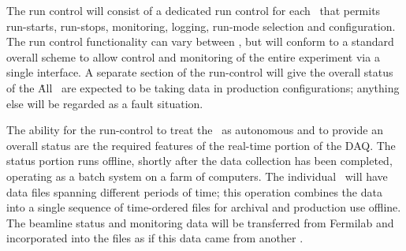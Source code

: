 The  run control will consist of a dedicated run control for each
\COMPARTMENT\ that permits run-starts, run-stops, monitoring, logging,
run-mode selection and configuration.  The run control functionality can
vary between \COMPARTMENTS, but will conform to a
standard overall scheme to allow %
control and monitoring of the entire experiment via a single interface.
A separate section of the
run-control will give the overall status of the \COMPARTMENTS\. All
\COMPARTMENTS\ are expected to be taking data in production configurations; anything else will be regarded as a fault situation. 

The ability for the run-control to treat the \COMPARTMENTS\ as
autonomous and to provide an overall status are the required features of the
real-time portion of the DAQ.
The status portion %
runs offline, shortly after the data collection has been
completed, operating as a batch system on a farm of
computers.  The individual \COMPARTMENTS\
will have data files spanning different periods of time; this operation combines
the data into
a single sequence of time-ordered files for archival and production
use offline.  The beamline status and monitoring data will be
transferred from Fermilab and incorporated into the files as if this data 
came from another \COMPARTMENT.